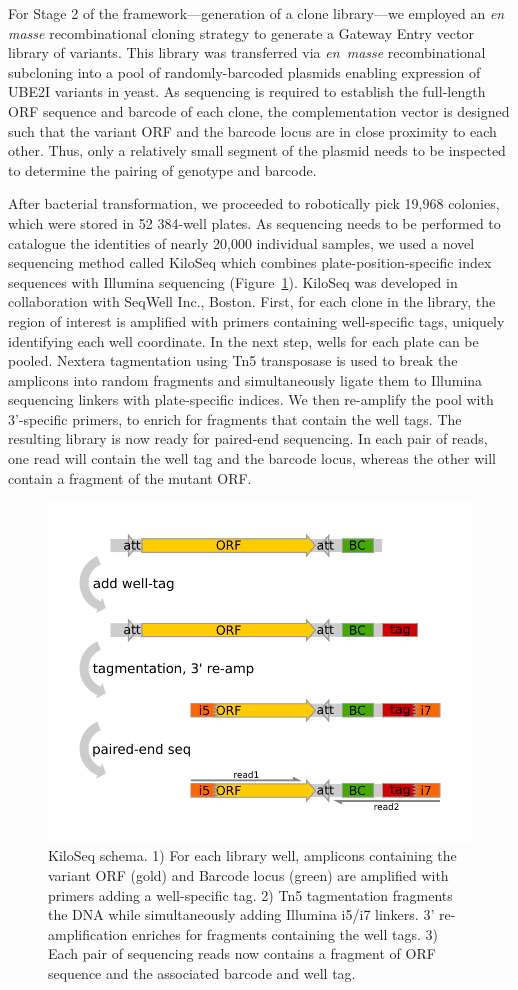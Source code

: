 For Stage 2 of the framework---generation of a clone library---we employed an \textit{en masse} recombinational cloning strategy to generate a Gateway Entry vector library of  variants. This library was transferred via \textit{en~masse} recombinational subcloning into a pool of randomly-barcoded plasmids enabling expression of UBE2I variants in yeast. As sequencing is required to establish the full-length ORF sequence and barcode of each clone, the complementation vector is designed such that the variant ORF and the barcode locus are in close proximity to each other. Thus, only a relatively small segment of the plasmid needs to be inspected to determine the pairing of genotype and barcode. 

After bacterial transformation, we proceeded to robotically pick 19,968 colonies, which were stored in 52 384-well plates. As sequencing needs to be performed to catalogue the identities of nearly 20,000 individual samples, we used a novel sequencing method called KiloSeq which combines plate-position-specific index sequences with Illumina sequencing (Figure~\ref{fig:kiloseq_schema}).
KiloSeq was developed in collaboration with SeqWell Inc., Boston. First, for each clone in the library, the region of interest is amplified with primers containing well-specific tags, uniquely identifying each well coordinate. In the next step, wells for each plate can be pooled. Nextera tagmentation using Tn5 transposase is used to break the amplicons into random fragments and simultaneously ligate them to Illumina sequencing linkers with plate-specific indices. We then re-amplify the pool with  3'-specific primers, to enrich for fragments that contain the well tags. The resulting library is now ready for paired-end sequencing. In each pair of reads, one read will contain the well tag and the barcode locus, whereas the other will contain a fragment of the mutant ORF.

\begin{figure}[h!]
	\centering
	\includegraphics[width=.5\textwidth]{img/kiloseq_schema_new.pdf}
	\caption{KiloSeq schema. 1) For each library well, amplicons containing the variant ORF (gold) and Barcode locus (green) are amplified with primers adding a well-specific tag. 2) Tn5 tagmentation fragments the DNA while simultaneously adding Illumina i5/i7 linkers. 3' re-amplification enriches for fragments containing the well tags. 3) Each pair of sequencing reads now contains a fragment of ORF sequence and the associated barcode and well tag.}
	\label{fig:kiloseq_schema}
\end{figure}

